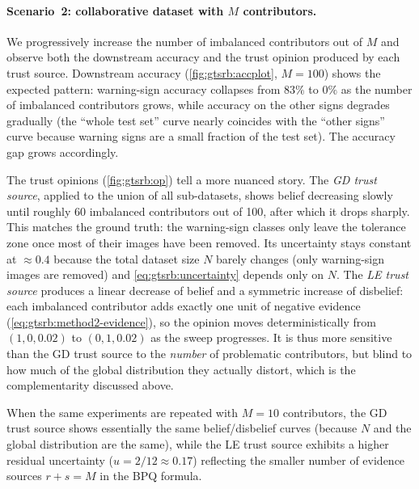 \paragraph{Scenario~2: collaborative dataset with $M$ contributors.}
We progressively increase the number of imbalanced contributors out of $M$ and observe both the downstream accuracy and the trust opinion produced by each trust source. Downstream accuracy (\cref{fig:gtsrb:accplot}, $M = 100$) shows the expected pattern: warning-sign accuracy collapses from $83\%$ to $0\%$ as the number of imbalanced contributors grows, while accuracy on the other signs degrades gradually (the ``whole test set'' curve nearly coincides with the ``other signs'' curve because warning signs are a small fraction of the test set). The accuracy gap grows accordingly.

The trust opinions (\cref{fig:gtsrb:op}) tell a more nuanced story. The \emph{GD trust source}, applied to the union of all sub-datasets, shows belief decreasing slowly until roughly 60 imbalanced contributors out of 100, after which it drops sharply. This matches the ground truth: the warning-sign classes only leave the tolerance zone once most of their images have been removed. Its uncertainty stays constant at $\approx 0.4$ because the total dataset size $N$ barely changes (only warning-sign images are removed) and \cref{eq:gtsrb:uncertainty} depends only on $N$. The \emph{LE trust source} produces a linear decrease of belief and a symmetric increase of disbelief: each imbalanced contributor adds exactly one unit of negative evidence (\cref{eq:gtsrb:method2-evidence}), so the opinion moves deterministically from $(1, 0, 0.02)$ to $(0, 1, 0.02)$ as the sweep progresses. It is thus more sensitive than the GD trust source to the \emph{number} of problematic contributors, but blind to how much of the global distribution they actually distort, which is the complementarity discussed above.

When the same experiments are repeated with $M = 10$ contributors, the GD trust source shows essentially the same belief/disbelief curves (because $N$ and the global distribution are the same), while the LE trust source exhibits a higher residual uncertainty ($u = 2/12 \approx 0.17$) reflecting the smaller number of evidence sources $r + s = M$ in the \ac{BPQ} formula.

